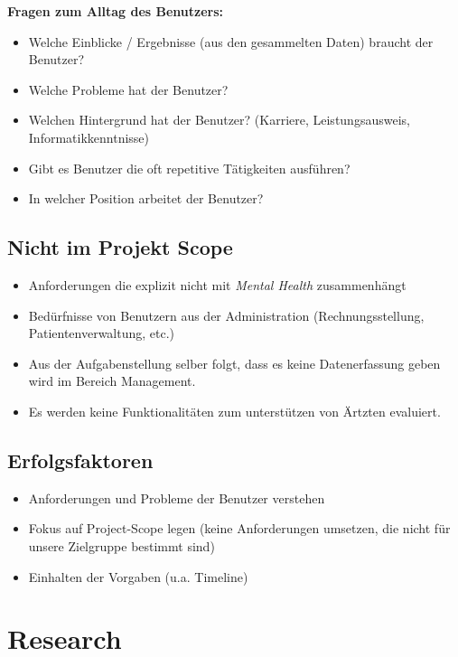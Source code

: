 \documentclass[a4paper]{scrreprt}
\begin{document}
\textbf{Fragen zum Alltag des Benutzers:}

\begin{itemize}
\item Welche Einblicke / Ergebnisse (aus den gesammelten Daten) braucht der Benutzer?
\item Welche Probleme hat der Benutzer?
\item Welchen Hintergrund hat der Benutzer? (Karriere, Leistungsausweis, Informatikkenntnisse)
\item Gibt es Benutzer die oft repetitive Tätigkeiten ausführen?
\item In welcher Position arbeitet der Benutzer?
\end{itemize}

\subsection{Nicht im Projekt Scope}

\begin{itemize}
\item Anforderungen die explizit nicht mit \textit{Mental Health} zusammenhängt
\item Bedürfnisse von Benutzern aus der Administration (Rechnungsstellung, Patientenverwaltung, etc.)
\item Aus der Aufgabenstellung selber folgt, dass es keine Datenerfassung geben wird im Bereich Management.
\item Es werden keine Funktionalitäten zum unterstützen von Ärtzten evaluiert. 
\end{itemize} 

\subsection{Erfolgsfaktoren}

\begin{itemize}
\item Anforderungen und Probleme der Benutzer verstehen
\item Fokus auf Project-Scope legen (keine Anforderungen umsetzen, die nicht für unsere Zielgruppe bestimmt sind)
\item Einhalten der Vorgaben (u.a. Timeline)
\end{itemize} 



\section{Research}
\end{document}
